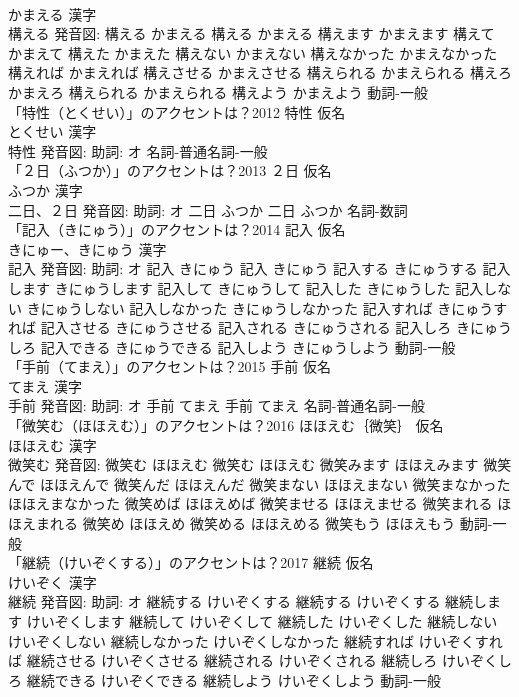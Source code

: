 \documentclass[8pt]{extreport}
\begin{document}
\begin{CJK}{UTF8}{min}
\\	かまえる 漢字　
\\	構える 発音図:	構える かまえる		構える かまえる 構えます かまえます 構えて かまえて 構えた かまえた 構えない かまえない 構えなかった かまえなかった 構えれば かまえれば 構えさせる かまえさせる 構えられる かまえられる 構えろ かまえろ 構えられる かまえられる 構えよう かまえよう				動詞-一般 
\\	「特性（とくせい）」のアクセントは？2012	特性 仮名　
\\	とくせい 漢字　
\\	特性 発音図: 助詞: オ							名詞-普通名詞-一般 
\\	「２日（ふつか）」のアクセントは？2013	２日 仮名　
\\	ふつか 漢字　
\\	二日、２日 発音図: 助詞: オ	二日 ふつか		二日 ふつか				名詞-数詞 
\\	「記入（きにゅう）」のアクセントは？2014	記入 仮名　
\\	きにゅー、きにゅう 漢字　
\\	記入 発音図: 助詞: オ	記入 きにゅう		記入 きにゅう 記入する きにゅうする 記入します きにゅうします 記入して きにゅうして 記入した きにゅうした 記入しない きにゅうしない 記入しなかった きにゅうしなかった 記入すれば きにゅうすれば 記入させる きにゅうさせる 記入される きにゅうされる 記入しろ きにゅうしろ 記入できる きにゅうできる 記入しよう きにゅうしよう				動詞-一般 
\\	「手前（てまえ）」のアクセントは？2015	手前 仮名　
\\	てまえ 漢字　
\\	手前 発音図: 助詞: オ	手前 てまえ		手前 てまえ				名詞-普通名詞-一般 
\\	「微笑む（ほほえむ）」のアクセントは？2016	ほほえむ｛微笑｝ 仮名　
\\	ほほえむ 漢字　
\\	微笑む 発音図:	微笑む ほほえむ		微笑む ほほえむ 微笑みます ほほえみます 微笑んで ほほえんで 微笑んだ ほほえんだ 微笑まない ほほえまない 微笑まなかった ほほえまなかった 微笑めば ほほえめば 微笑ませる ほほえませる 微笑まれる ほほえまれる 微笑め ほほえめ 微笑める ほほえめる 微笑もう ほほえもう				動詞-一般 
\\	「継続（けいぞくする）」のアクセントは？2017	継続 仮名　
\\	けいぞく 漢字　
\\	継続 発音図: 助詞: オ	継続する けいぞくする		継続する けいぞくする 継続します けいぞくします 継続して けいぞくして 継続した けいぞくした 継続しない けいぞくしない 継続しなかった けいぞくしなかった 継続すれば けいぞくすれば 継続させる けいぞくさせる 継続される けいぞくされる 継続しろ けいぞくしろ 継続できる けいぞくできる 継続しよう けいぞくしよう				動詞-一般 

\end{CJK}
\end{document}

